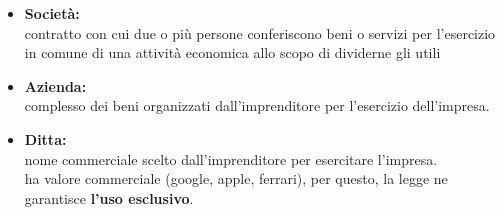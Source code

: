 \documentclass[../main.tex]{subfiles}
\begin{document}
    \begin{itemize}
        \item \textbf{Società:}\\			
            contratto con cui due o più persone conferiscono beni o servizi per l'esercizio in comune di una attività economica allo scopo di dividerne gli utili
        
        \item \textbf{Azienda:}\\			
            complesso dei beni organizzati dall'imprenditore per l'esercizio dell'impresa.
            
        \item \textbf{Ditta:}\\			
            nome commerciale scelto dall'imprenditore per esercitare l'impresa.\\				
            ha valore commerciale (google, apple, ferrari), per questo, la legge ne garantisce \textbf{l'uso esclusivo}.
            
    \end{itemize}
\end{document}
